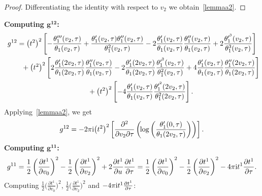\documentclass[pdftex]{sigma}%
\numberwithin{equation}{section}
\begin{document}
\begin{proof}
Differentiating the identity \label{idtheta1} with respect to $v_2$ we obtain~\eqref{lemmaa2}.
\end{proof}
\textbf{Computing $\boldsymbol {g^{12}}$:}
\begin{gather*}
g^{12}=\big(t^2\big)^2\left[-\frac{\theta_1^{\prime\prime\prime}(v_2,\tau)}{\theta_1(v_2,\tau)} +\frac{\theta_1^{\prime}(v_2,\tau)\theta_1^{\prime\prime}(v_2,\tau)}{\theta_1^2(v_2,\tau)}
-2\frac{\theta_1^{\prime}(v_2,\tau)}{\theta_1(v_2,\tau)} \frac{\theta_1^{\prime\prime}(v_2,\tau)}{\theta_1(v_2,\tau)} +2\frac{\theta_1^{\prime^3}(v_2,\tau)}{\theta_1^3(v_2,\tau)}\right]
\\ \hphantom{g^{12}=}
{}+\big(t^2\big)^2\left[2\frac{\theta_1^{\prime}(2v_2,\tau)}{\theta_1(2v_2,\tau)} \frac{\theta_1^{\prime\prime}(v_2,\tau)}{\theta_1(v_2,\tau)} -2\frac{\theta_1^{\prime}(2v_2,\tau)}{\theta_1(2v_2,\tau)} \frac{\theta_1^{\prime^2}(v_2,\tau)}{\theta_1^2(v_2,\tau)} +4\frac{\theta_1^{\prime}(v_2,\tau)}{\theta_1(v_2,\tau)} \frac{\theta_1^{\prime\prime}(2v_2,\tau)}{\theta_1(2v_2,\tau)}\right]
\\ \hphantom{g^{12}=}
{}+\big(t^2\big)^2 \left[ - 4\frac{\theta_1^{\prime}(v_2,\tau)}{\theta_1(v_2,\tau)} \frac{\theta_1^{\prime^2}(2v_2,\tau)}{\theta_1^2(2v_2,\tau)}\right].
\end{gather*}
Applying~\eqref{lemmaa2}, we get
\begin{gather*}
g^{12}=-2\pi {\rm i}\big(t^2\big)^2\left[\frac{\partial^2}{\partial v_2\partial \tau}\left(\!\log\left(\frac{\theta_1^{\prime}(0,\tau)}{\theta_1(2v_2,\tau)}\right)\right)\right].
\end{gather*}
\textbf{Computing $\boldsymbol {g^{11}}$:}
\begin{gather*}
g^{11}=\frac{1}{2}\left(\frac{\partial t^1}{\partial v_0}\right)^2-\frac{1}{2}\left(\frac{\partial t^1}{\partial v_2}\right)^2+2\frac{\partial t^1}{\partial u}\frac{\partial t^1}{\partial \tau}
=\frac{1}{2}\left(\frac{\partial t^1}{\partial v_0}\right)^2-\frac{1}{2}\left(\frac{\partial t^1}{\partial v_2}\right)^2-4\pi {\rm i}t^1\frac{\partial t^1}{\partial \tau}.
\end{gather*}
Computing $\frac{1}{2}\big(\frac{\partial t^1}{\partial v_0}\big)^2$, $\frac{1}{2}\big(\frac{\partial t^1}{\partial v_2}\big)^2$ and $-4\pi {\rm i}t^1\frac{\partial t^1}{\partial \tau}$:
\end{document}
